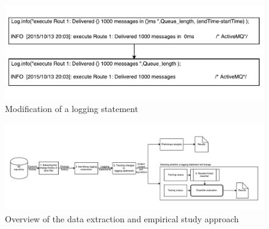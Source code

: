 \begin{figure}[tb]
	\centering
	\includegraphics[width=1\columnwidth]{ExampleOfLogChange_LPA}
	\caption{Modification of a logging statement}
	\label{fig:ExampleOfLogChange_LPA}
\end{figure}

\begin{figure}
	\centering
	\includegraphics[width=1\textwidth,
	height=.4\textwidth,trim={0 1cm 0 1cm },clip]{LogGenalogyMethdology}
	\caption{Overview of the data extraction and empirical study approach}
	\label{fig:LGmethod}
\end{figure}




